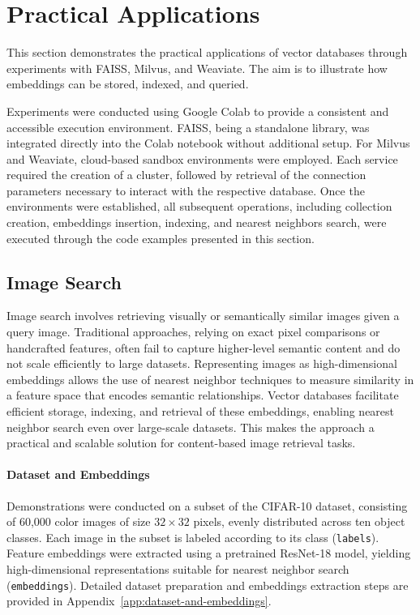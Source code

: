 \section{Practical Applications}

This section demonstrates the practical applications of vector databases through experiments with FAISS, Milvus, and Weaviate. The aim is to illustrate how embeddings can be stored, indexed, and queried.

Experiments were conducted using Google Colab to provide a consistent and accessible execution environment. FAISS, being a standalone library, was integrated directly into the Colab notebook without additional setup. For Milvus and Weaviate, cloud-based sandbox environments were employed. Each service required the creation of a cluster, followed by retrieval of the connection parameters necessary to interact with the respective database. Once the environments were established, all subsequent operations, including collection creation, embeddings insertion, indexing, and nearest neighbors search, were executed through the code examples presented in this section.

\subsection{Image Search}

Image search involves retrieving visually or semantically similar images given a query image. Traditional approaches, relying on exact pixel comparisons or handcrafted features, often fail to capture higher-level semantic content and do not scale efficiently to large datasets. Representing images as high-dimensional embeddings allows the use of nearest neighbor techniques to measure similarity in a feature space that encodes semantic relationships. Vector databases facilitate efficient storage, indexing, and retrieval of these embeddings, enabling nearest neighbor search even over large-scale datasets. This makes the approach a practical and scalable solution for content-based image retrieval tasks.

\paragraph{Dataset and Embeddings}

Demonstrations were conducted on a subset of the CIFAR-10 dataset, consisting of 60,000 color images of size $32 \times 32$ pixels, evenly distributed across ten object classes. Each image in the subset is labeled according to its class (\texttt{labels}). Feature embeddings were extracted using a pretrained ResNet-18 model, yielding high-dimensional representations suitable for nearest neighbor search (\texttt{embeddings}). Detailed dataset preparation and embeddings extraction steps are provided in Appendix~\ref{app:dataset-and-embeddings}.

